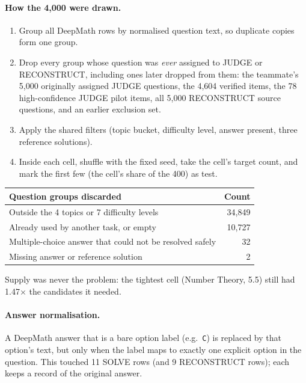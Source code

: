 \documentclass[11pt,a4paper]{article}
\newcommand{\code}[1]{\texttt{#1}}
\begin{document}
\paragraph{How the 4,000 were drawn.}
\begin{enumerate}
\item Group all DeepMath rows by normalised question text, so duplicate copies form one group.
\item Drop every group whose question was \emph{ever} assigned to JUDGE or RECONSTRUCT, including ones later dropped from them: the teammate's 5,000 originally assigned JUDGE questions, the 4,604 verified items, the 78 high-confidence JUDGE pilot items, all 5,000 RECONSTRUCT source questions, and an earlier exclusion set.
\item Apply the shared filters (topic bucket, difficulty level, answer present, three reference solutions).
\item Inside each cell, shuffle with the fixed seed, take the cell's target count, and mark the first few (the cell's share of the 400) as test.
\end{enumerate}

\begin{table}[H]
\centering\small
\begin{tabular}{@{}lr@{}}
\toprule
Question groups discarded & Count \\
\midrule
Outside the 4 topics or 7 difficulty levels & 34,849 \\
Already used by another task, or empty & 10,727 \\
Multiple-choice answer that could not be resolved safely & 32 \\
Missing answer or reference solution & 2 \\
\bottomrule
\end{tabular}
\end{table}

Supply was never the problem: the tightest cell (Number Theory, 5.5) still had 1.47$\times$ the candidates it needed.

\paragraph{Answer normalisation.} A DeepMath answer that is a bare option label (e.g.\ \code{C}) is replaced by that option's text, but only when the label maps to exactly one explicit option in the question. This touched 11 SOLVE rows (and 9 RECONSTRUCT rows); each keeps a record of the original answer.
\end{document}
